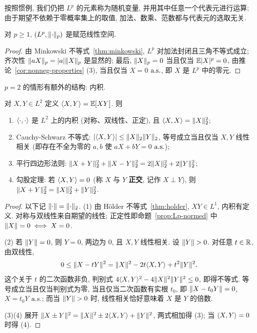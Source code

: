 按照惯例, 我们仍把 $L^p$ 的元素称为随机变量, 并用其中任意一个代表元进行运算; 由于期望不依赖于零概率集上的取值, 加法、数乘、范数都与代表元的选取无关.

\begin{proposition}\label{prop:Lp-normed}
对 $p\ge1$, $(L^p,\lVert\cdot\rVert_p)$ 是赋范线性空间.
\end{proposition}

\begin{proof}
由 Minkowski 不等式~\ref{thm:minkowski}, $L^p$ 对加法封闭且三角不等式成立; 齐次性 $\lVert aX\rVert_p=\lvert a\rvert\lVert X\rVert_p$ 是显然的; 最后, $\lVert X\rVert_p=0$ 当且仅当 $\mathbb{E}\lvert X\rvert^p=0$, 由推论~\ref{cor:nonneg-properties} (3), 当且仅当 $X=0$ $\text{a.s.}$, 即 $X$ 是 $L^p$ 中的零元.
\end{proof}

$p=2$ 的情形有额外的结构: 内积.

\begin{proposition}[$L^2$ 的内积]\label{prop:L2-inner}
对 $X,Y\in L^2$ 定义 $\langle X,Y\rangle=\mathbb{E}[XY]$. 则
\begin{enumerate}
\item $\langle\cdot,\cdot\rangle$ 是 $L^2$ 上的内积 (对称、双线性、正定), 且 $\langle X,X\rangle=\lVert X\rVert_2^2$;
\item Cauchy-Schwarz 不等式: $\lvert\langle X,Y\rangle\rvert\le\lVert X\rVert_2\lVert Y\rVert_2$, 等号成立当且仅当 $X,Y$ 线性相关 (即存在不全为零的 $a,b$ 使 $aX+bY=0$ $\text{a.s.}$);
\item 平行四边形法则: $\lVert X+Y\rVert_2^2+\lVert X-Y\rVert_2^2=2\lVert X\rVert_2^2+2\lVert Y\rVert_2^2$;
\item 勾股定理: 若 $\langle X,Y\rangle=0$ (称 $X$ 与 $Y$ \textbf{正交}, 记作 $X\perp Y$), 则 $\lVert X+Y\rVert_2^2=\lVert X\rVert_2^2+\lVert Y\rVert_2^2$.
\end{enumerate}
\end{proposition}

\begin{proof}
以下记 $\lVert\cdot\rVert=\lVert\cdot\rVert_2$. (1) 由 H\"older 不等式~\ref{thm:holder}, $XY\in L^1$, 内积有定义. 对称与双线性来自期望的线性; 正定性即命题~\ref{prop:Lp-normed} 中 $\lVert X\rVert=0\iff X=0$.

(2) 若 $\lVert Y\rVert=0$, 则 $Y=0$, 两边为 $0$, 且 $X,Y$ 线性相关. 设 $\lVert Y\rVert>0$. 对任意 $t\in\mathbb{R}$, 由双线性,
\[
0\le\lVert X-tY\rVert^2=\lVert X\rVert^2-2t\langle X,Y\rangle+t^2\lVert Y\rVert^2.
\]
这个关于 $t$ 的二次函数非负, 判别式 $4\langle X,Y\rangle^2-4\lVert X\rVert^2\lVert Y\rVert^2\le0$, 即得不等式. 等号成立当且仅当判别式为零, 当且仅当二次函数有实根 $t_0$, 即 $\lVert X-t_0Y\rVert=0$, $X=t_0Y$ $\text{a.s.}$; 而当 $\lVert Y\rVert>0$ 时, 线性相关恰好意味着 $X$ 是 $Y$ 的倍数.

(3)(4) 展开 $\lVert X\pm Y\rVert^2=\lVert X\rVert^2\pm2\langle X,Y\rangle+\lVert Y\rVert^2$, 两式相加得 (3); 当 $\langle X,Y\rangle=0$ 时得 (4).
\end{proof}


